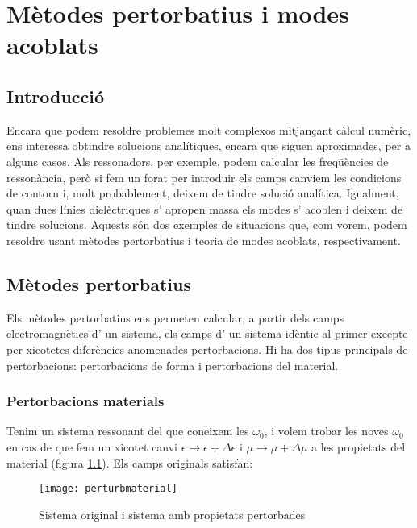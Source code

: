 \chapter{Mètodes pertorbatius i modes acoblats}

\section{Introducció}

Encara que podem resoldre problemes molt complexos mitjançant càlcul numèric, ens interessa obtindre solucions analítiques, encara que siguen aproximades, per a alguns casos. Als ressonadors, per exemple, podem calcular les freqüències de ressonància, però si fem un forat per introduir els camps canviem les condicions de contorn i, molt probablement, deixem de tindre solució analítica. Igualment, quan dues línies dielèctriques s' apropen massa els modes s' acoblen i deixem de tindre solucions. Aquests són dos exemples de situacions que, com vorem, podem resoldre usant mètodes pertorbatius i teoria de modes acoblats, respectivament.

\section{Mètodes pertorbatius}

Els mètodes pertorbatius ens permeten calcular, a partir dels camps electromagnètics d' un sistema, els camps d' un sistema idèntic al primer excepte per xicotetes diferències anomenades pertorbacions. Hi ha dos tipus principals de pertorbacions: pertorbacions de forma i pertorbacions del material.

\subsection{Pertorbacions materials}

Tenim un sistema ressonant del que coneixem les $\omega _0$, i volem trobar les noves $\omega _0$ en cas de que fem un xicotet canvi $\epsilon \to \epsilon + \Delta \epsilon$ i $\mu \to \mu + \Delta \mu$ a les propietats del material (figura \cref{perturbmaterial}). Els camps originals satisfan:

\begin{figure}[ht]
  \centering
  \texttt{[image: perturbmaterial]}
  \caption{Sistema original i sistema amb propietats pertorbades}
  \label{perturbmaterial}
\end{figure}

